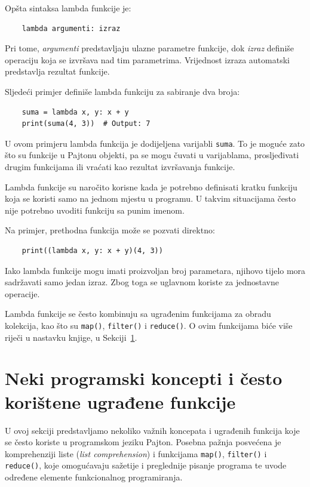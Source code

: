 Opšta sintaksa lambda funkcije je:

\begin{verbatim}
	lambda argumenti: izraz
\end{verbatim}

Pri tome, \textit{argumenti} predstavljaju ulazne parametre funkcije, dok \textit{izraz} definiše operaciju koja se izvršava nad tim parametrima. Vrijednost izraza automatski predstavlja rezultat funkcije.

Sljedeći primjer definiše lambda funkciju za sabiranje dva broja:

\begin{verbatim}
	suma = lambda x, y: x + y
	print(suma(4, 3))  # Output: 7
\end{verbatim}

U ovom primjeru lambda funkcija je dodijeljena varijabli \texttt{suma}. To je moguće zato što su funkcije u Pajtonu objekti, pa se mogu čuvati u varijablama, prosljeđivati drugim funkcijama ili vraćati kao rezultat izvršavanja funkcije.

Lambda funkcije su naročito korisne kada je potrebno definisati kratku funkciju koja se koristi samo na jednom mjestu u programu. U takvim situacijama često nije potrebno uvoditi funkciju sa punim imenom.

Na primjer, prethodna funkcija može se pozvati direktno:

\begin{verbatim}
	print((lambda x, y: x + y)(4, 3))
\end{verbatim}

Iako lambda funkcije mogu imati proizvoljan broj parametara, njihovo tijelo mora sadržavati samo jedan izraz. Zbog toga se uglavnom koriste za jednostavne operacije.

Lambda funkcije se često kombinuju sa ugrađenim funkcijama za obradu kolekcija, kao što su \texttt{map()}, \texttt{filter()} i \texttt{reduce()}. O ovim funkcijama biće više riječi u nastavku knjige, u Sekciji~\ref{sec:concepts-pyhton}.


\section{Neki programski koncepti i često korištene ugrađene funkcije}
\label{sec:concepts-pyhton}

U ovoj sekciji predstavljamo nekoliko važnih koncepata i ugrađenih funkcija koje se često koriste u programskom jeziku Pajton. Posebna pažnja posvećena je komprehenziji liste (\textit{list comprehension}) i funkcijama \texttt{map()}, \texttt{filter()} i \texttt{reduce()}, koje omogućavaju sažetije i preglednije pisanje programa te uvode određene elemente funkcionalnog programiranja.

